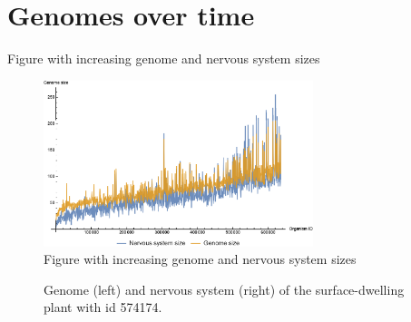 \section{Genomes over time}
Figure with increasing genome and nervous system sizes
\begin{figure}
  \begin{center}
  \includegraphics[width=0.7\textwidth]{figure/genomeSizes}
  \caption{
    Figure with increasing genome and nervous system sizes
  }
  \label{fig:genomeSizes}
  \end{center}
\end{figure}

\begin{figure}[ht]
    \begin{center}
    \end{center}
    \caption{Genome (left) and nervous system (right) of the surface-dwelling plant with id 574174.}
    \label{fig:planGgenome}
\end{figure}

